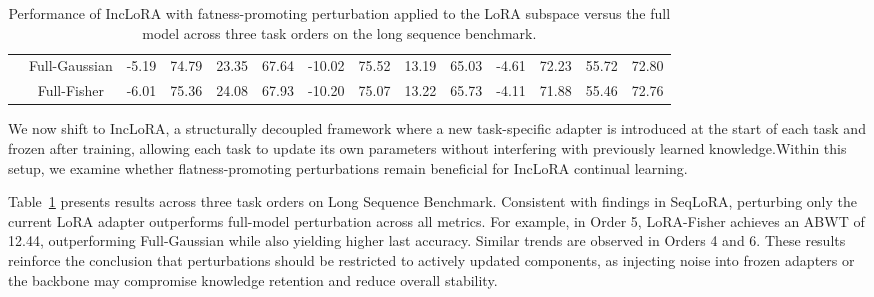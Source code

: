 \documentclass[letterpaper]{article} %
\begin{document}
\begin{table}[thbp]
{\begin{tabular}{cc|cccc|cccc|cccc}
& Full-Gaussian   & -5.19 & 74.79 & 23.35 & 67.64   & -10.02 & 75.52 & {13.19} & 65.03   & -4.61 & 72.23 & 55.72 & 72.80 \\
& Full-Fisher     & -6.01 & 75.36 & 24.08 & 67.93   & -10.20 & 75.07 & 13.22 & 65.73   & -4.11 & 71.88 & 55.46 & 72.76 \\
\bottomrule
\end{tabular}
}
\caption{Performance of IncLoRA with fatness-promoting perturbation applied to the LoRA subspace versus the full model across three task orders on the long sequence benchmark.}
\label{tab:comparison_seqlora_inclora_vertical}
\end{table}



We now shift to IncLoRA, a structurally decoupled framework where a new task-specific adapter is introduced at the start of each task and frozen after training, allowing each task to update its own parameters without interfering with previously learned knowledge.Within this setup, we examine whether flatness-promoting perturbations remain beneficial for IncLoRA continual learning.


Table~\ref{tab:comparison_seqlora_inclora_vertical} presents results across three task orders on Long Sequence Benchmark. Consistent with findings in SeqLoRA, perturbing only the current LoRA adapter outperforms full-model perturbation across all metrics. For example, in Order 5, LoRA-Fisher achieves an ABWT of 12.44, outperforming Full-Gaussian while also yielding higher last accuracy. Similar trends are observed in Orders 4 and 6. These results reinforce the conclusion that perturbations should be restricted to actively updated components, as injecting noise into frozen adapters or the backbone may compromise knowledge retention and reduce overall stability.





\end{document}
